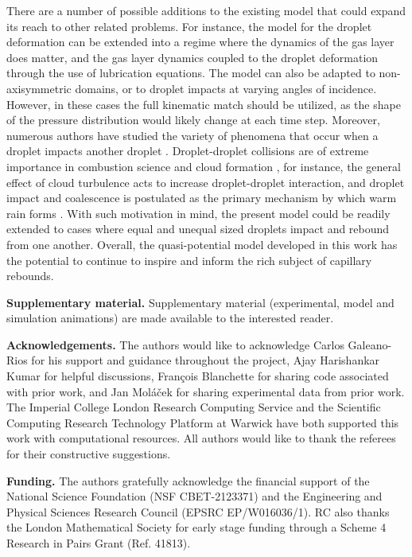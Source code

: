 \documentclass{jfm}
\begin{document}
There are a number of possible additions to the existing model that could expand its reach to other related problems.  For instance, the model for the droplet deformation can be extended into a regime where the dynamics of the gas layer does matter, and the gas layer dynamics coupled to the droplet deformation through the use of lubrication equations. The model can also be adapted to non-axisymmetric domains, or to droplet impacts at varying angles of incidence. However, in these cases the full kinematic match should be utilized, as the shape of the pressure distribution would likely change at each time step.  Moreover, numerous authors have studied the variety of phenomena that occur when a droplet impacts another droplet \citep{qian1997regimes,tang2012bouncing}. Droplet-droplet collisions are of extreme importance in combustion science \citep{jiang1992experimental} and cloud formation \citep{grabowski2013growth}, for instance, the general effect of cloud turbulence acts to increase droplet-droplet interaction, and droplet impact and coalescence is postulated as the primary mechanism by which warm rain forms \citep{grabowski2013growth}. With such motivation in mind, the present model could be readily extended to cases where equal and unequal sized droplets impact and rebound from one another. Overall, the quasi-potential model developed in this work has the potential to continue to inspire and inform the rich subject of capillary rebounds.

\vspace{5mm}
{\bf Supplementary material.} Supplementary material (experimental, model and simulation animations) are made available to the interested reader.

\vspace{5mm}
{\bf Acknowledgements.} The authors would like to acknowledge Carlos Galeano-Rios for his support and guidance throughout the project, Ajay Harishankar Kumar for helpful discussions, Fran{\c{c}}ois Blanchette for sharing code associated with prior work, and Jan Mol{\'a}{\v{c}}ek for sharing experimental data from prior work. The Imperial College London Research Computing Service and the Scientific Computing Research Technology Platform at Warwick have both supported this work with computational resources. All authors would like to thank the referees for their constructive suggestions.

 
\vspace{5mm}
{\bf Funding.} The authors gratefully acknowledge the financial support of the National Science Foundation (NSF CBET-2123371) and the Engineering and Physical Sciences Research Council (EPSRC EP/W016036/1). RC also thanks the London Mathematical Society for early stage funding through a Scheme 4 Research in Pairs Grant (Ref. 41813).
\end{document}
